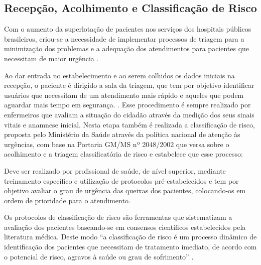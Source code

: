 \subsection{\textbf{Recepção, Acolhimento e Classificação de Risco}}

Com o aumento da superlotação de pacientes nos serviços dos hospitais públicos brasileiros, criou-se a necessidade de implementar processos de triagem para a minimização dos problemas e a adequação dos atendimentos para pacientes que necessitam de maior urgência \cite{albino}.

Ao dar entrada no estabelecimento e ao serem colhidos os dados iniciais na recepção, o paciente é dirigido a sala da triagem, que tem por objetivo identificar usuários que necessitam de um atendimento mais rápido e aqueles que podem aguardar mais tempo em segurança. \cite{albino}. Esse procedimento é sempre realizado por enfermeiros que avaliam a situação do cidadão através da medição dos seus sinais vitais e anamnese inicial. 
Nesta etapa também é realizada a classificação de risco, proposta pelo Ministério da Saúde através da política nacional de atenção às urgências, com base na Portaria GM/MS nº 2048/2002 que versa sobre o acolhimento e a triagem classificatória de risco e estabelece que esse processo:

\begin{citacao}
Deve ser realizado por profissional de saúde, de nível superior, mediante treinamento específico e utilização de protocolos pré-estabelecidos e tem por objetivo avaliar o grau de urgência das queixas dos pacientes, colocando-os em ordem de prioridade para o atendimento. \cite[p. 65]{politicaurgencias}
\end{citacao}

Os protocolos de classificação de risco são ferramentas que sistematizam a avaliação dos pacientes baseando-se em consensos científicos estabelecidos pela literatura médica. Deste modo ``a classificação de risco é um processo dinâmico de identificação dos pacientes que necessitam de tratamento imediato, de acordo com o potencial de risco, agravos à saúde ou grau de sofrimento'' \cite[p. 20]{humanizasus}.

